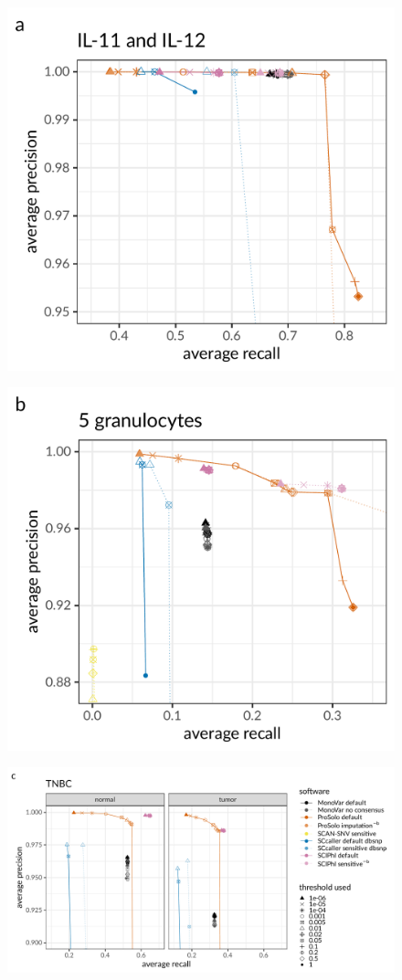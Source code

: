 \documentclass[12pt,inline]{wlscirep}
\begin{document}
\begin{figure}[!tpb]
 \begin{minipage}{.48\linewidth}
  \includegraphics[height=40ex]{figs/Dong2017/Dong2017_prosolo-monovar-scansnv-sccaller_precision-recall-plot_focus-tools.pdf} \\
 \end{minipage}
 \begin{minipage}{.48\linewidth}
  \includegraphics[height=40ex]{figs/Laehnemann2017/Laehnemann2017_prosolo-monovar-scansnv-sccaller-sciphi_precision-recall-plot_focus-top-left.pdf} \\
 \end{minipage}\newline
 \begin{minipage}{.95\linewidth}
  \includegraphics[height=45ex]{figs/Wang2014/Wang2014_prosolo-monovar-scansnv-sccaller-scvilp_precision-recall-plot_focus-tools.pdf} \\
 \end{minipage}


\end{figure}
\end{document}
